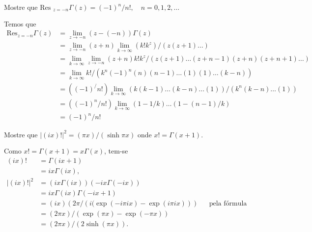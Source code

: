 \documentclass[a4paper,12pt, leqno, answers]{exam}
\begin{document}
\begin{questions}
    \question Mostre que $\text{Res }_{z = -n} \Gamma(z) = \left( -1 \right)^n / n!, \quad n = 0, 1, 2, \ldots$
    \begin{solution}
        Temos que
        \begin{align*}
            \text{Res}_{z = -n} \Gamma(z) &= \lim_{z \to - n} \left( z - (-n) \right) \Gamma(z) \\
            &= \lim_{z \to -n} \left( z + n \right) \lim_{k \to \infty} \left( k! k^z \right) / \left( z (z + 1) \ldots \right) \\
            &= \lim_{k \to \infty} \lim_{z \to -n} (z + n) k! k^z / \left( z (z + 1) \ldots (z + n - 1) (z + n) (z + n + 1) \ldots \right) \\
            &= \lim_{k \to \infty} k! / \left( k^n (-1)^n (n) (n - 1) \ldots (1) (1) \ldots (k - n) \right) \\
            &= \left( (-1)^ / n! \right) \lim_{k \to \infty} \left( k (k - 1) \ldots (k - n) \ldots (1) \right) / \left( k^n (k - n) \ldots (1) \right) \\
            &= \left( (-1)^n / n! \right) \lim_{k \to \infty} \left( 1 - 1 /k \right) \ldots \left( 1 - (n - 1) / k \right) \\
            &= (-1)^n / n!
        \end{align*}
    \end{solution}

    \question Mostre que $| \left( i x \right)! |^2 = \left( \pi x \right) / \left( \sinh \pi x \right)$ onde $x! = \Gamma(x + 1)$.
    \begin{solution}
        Como $x! = \Gamma(x + 1) = x \Gamma(x)$, tem-se
        \begin{align*}
            (i x)! &= \Gamma(ix + 1) \\
            &= ix \Gamma(i x), \\
            | (i x)! |^2 &= \left( i x \Gamma(i x) \right) \left( -i x \Gamma(-i x) \right) \\
            &= i x \Gamma(i x) \Gamma(-i x + 1) \\
            &= (i x) \left( 2 \pi / \left( i ( \exp(-i \pi i x) - \exp(i \pi i x) \right) \right) && \text{pela f\'{o}rmula de reflex\~{a}o} \\
            &=\left( 2 \pi x \right) / \left( \exp(\pi x) - \exp(-\pi x) \right) \\
            &= \left( 2 \pi x \right) / \left( 2 \sinh(\pi x) \right).
        \end{align*}


\end{solution}
\end{questions}
\end{document}
